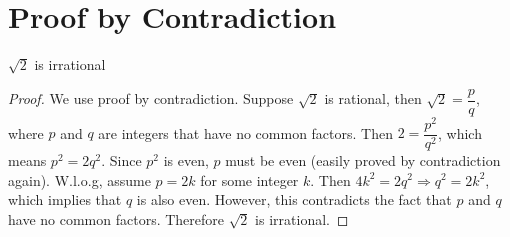 \section{Proof by Contradiction}
\begin{thm}
    $\sqrt{2}$ is irrational
\end{thm}
\begin{proof}
    We use proof by contradiction. Suppose $\sqrt{2}$ is rational, then $\sqrt{2}=\dfrac{p}{q}$,
    where $p$ and $q$ are integers that have no common factors. Then $2=\dfrac{p^2}{q^2}$,
    which means $p^2=2q^2$. Since $p^2$ is even, $p$ must be even (easily proved by contradiction again).
    W.l.o.g, assume $p=2k$ for some integer $k$. Then $4k^2=2q^2 \Rightarrow q^2=2k^2$, which
    implies that $q$ is also even. However, this contradicts the fact that $p$
    and $q$ have no common factors. Therefore $\sqrt{2}$ is irrational.
\end{proof}
